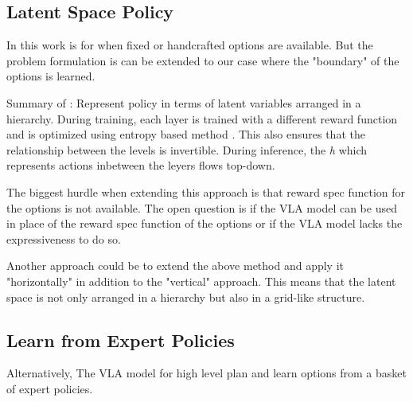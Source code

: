 
\subsection{Latent Space Policy}

In this work \cite{haarnojaLatentSpacePolicies2018} is for when fixed or handcrafted options are available. But the problem formulation is can be extended to our case where the "boundary" of the options is learned.

Summary of \cite{haarnojaLatentSpacePolicies2018}: Represent policy in terms of latent variables arranged in a hierarchy. During training, each layer is trained with a different reward function and is optimized using entropy based method \cite{haarnojaReinforcementLearningDeep}. This also ensures that the relationship between the levels is invertible. During inference, the \textit{h} which represents actions inbetween the leyers flows top-down.

The biggest hurdle when extending this approach is that reward spec function for the options is not available.
The open question is if the VLA model can be used in place of the reward spec function of the options or if the VLA model lacks the expressiveness to do so.

Another approach could be to extend the above method and apply it "horizontally" in addition to the "vertical" approach. This means that the latent space is not only arranged in a hierarchy but also in a grid-like structure.

\subsection{Learn from Expert Policies}

Alternatively, The VLA model for high level plan \cite{patzoldLeveragingVisionLanguageModels2025} and learn options from a basket of expert policies.
